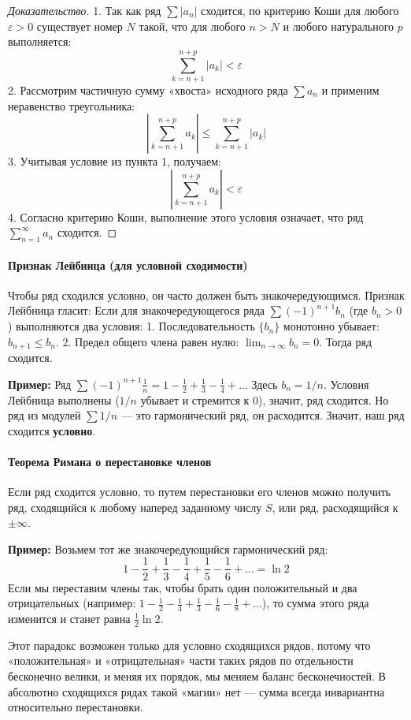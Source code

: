 \begin{proof}[Доказательство]
1. Так как ряд $\sum |a_n|$ сходится, по критерию Коши для любого $\varepsilon > 0$ существует номер $N$ такой, что для любого $n > N$ и любого натурального $p$ выполняется:
$$ \sum_{k=n+1}^{n+p} |a_k| < \varepsilon $$
2. Рассмотрим частичную сумму «хвоста» исходного ряда $\sum a_n$ и применим неравенство треугольника:
$$ \left| \sum_{k=n+1}^{n+p} a_k \right| \le \sum_{k=n+1}^{n+p} |a_k| $$
3. Учитывая условие из пункта 1, получаем:
$$ \left| \sum_{k=n+1}^{n+p} a_k \right| < \varepsilon $$
4. Согласно критерию Коши, выполнение этого условия означает, что ряд $\sum_{n=1}^\infty a_n$ сходится.
\end{proof}

\paragraph{Признак Лейбница (для условной сходимости)}
Чтобы ряд сходился условно, он часто должен быть знакочередующимся. Признак Лейбница гласит:
Если для знакочередующегося ряда $\sum (-1)^{n+1} b_n$ (где $b_n > 0$) выполняются два условия:
1. Последовательность $\{b_n\}$ монотонно убывает: $b_{n+1} \le b_n$.
2. Предел общего члена равен нулю: $\lim_{n \to \infty} b_n = 0$.
Тогда ряд сходится.

\textbf{Пример:} Ряд $\sum (-1)^{n+1} \frac{1}{n} = 1 - \frac{1}{2} + \frac{1}{3} - \frac{1}{4} + \dots$
Здесь $b_n = 1/n$. Условия Лейбница выполнены ($1/n$ убывает и стремится к 0), значит, ряд сходится. Но ряд из модулей $\sum 1/n$ — это гармонический ряд, он расходится. Значит, наш ряд сходится \textbf{условно}.

\paragraph{Теорема Римана о перестановке членов}
Если ряд сходится условно, то путем перестановки его членов можно получить ряд, сходящийся к любому наперед заданному числу $S$, или ряд, расходящийся к $\pm\infty$.

\textbf{Пример:} Возьмем тот же знакочередующийся гармонический ряд:
$$ 1 - \frac{1}{2} + \frac{1}{3} - \frac{1}{4} + \frac{1}{5} - \frac{1}{6} + \dots = \ln 2 $$
Если мы переставим члены так, чтобы брать один положительный и два отрицательных (например: $1 - \frac{1}{2} - \frac{1}{4} + \frac{1}{3} - \frac{1}{6} - \frac{1}{8} + \dots$), то сумма этого ряда изменится и станет равна $\frac{1}{2} \ln 2$. 

Этот парадокс возможен только для условно сходящихся рядов, потому что «положительная» и «отрицательная» части таких рядов по отдельности бесконечно велики, и меняя их порядок, мы меняем баланс бесконечностей. В абсолютно сходящихся рядах такой «магии» нет — сумма всегда инвариантна относительно перестановки.


